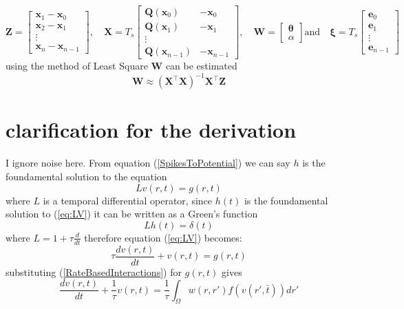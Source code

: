 \documentclass[onecolumn,draftcls]{IEEEtran}
\begin{document}
\begin{equation}
 \mathbf Z=\begin{bmatrix} \mathbf x_{1}-\mathbf x_{0}\\\mathbf x_{2}-\mathbf x_{1}\\\vdots\\\mathbf x_{n}-\mathbf x_{n-1}\end{bmatrix},\quad \mathbf X=T_s\begin{bmatrix}\mathbf Q(\mathbf x_0)&-\mathbf x_{0}\\\mathbf Q(\mathbf x_1)&-\mathbf x_{1}\\\vdots\\ \mathbf Q(\mathbf x_{n-1})&-\mathbf x_{n-1}\end{bmatrix},\quad \mathbf W=\begin{bmatrix} \boldsymbol{\theta} \\ \alpha\end{bmatrix} \text{and}\quad \boldsymbol \xi=T_s\begin{bmatrix}\mathbf e_0\\\mathbf e_1\\\vdots\\\mathbf e_{n-1}\end{bmatrix}
\end{equation}
using the method of Least Square $ \mathbf W$ can be estimated
\begin{equation}
 \mathbf W\approx(\mathbf X^\top\mathbf X)^{-1}\mathbf X^\top\mathbf Z
\end{equation}

\section{clarification for the derivation} 
I ignore noise here. From equation (\ref{SpikesToPotential}) we can say $h$ is the foundamental solution to the equation
\begin{equation}
 Lv(r,t)=g(r,t)
\label{eq:LV}
\end{equation}
where $L$ is a temporal differential operator, since $h(t)$ is the foundamental solution to (\ref{eq:LV}) it can be written as a Green's function
\begin{equation}
 Lh(t)=\delta(t)
\end{equation}
where $L=1+\tau\frac{d}{dt}$ therefore equation (\ref{eq:LV}) becomes:
\begin{equation}
\tau\frac{dv(r,t)}{dt}+ v(r,t)=g(r,t)
\end{equation}
substituting (\ref{RateBasedInteractions}) for $g(r,t)$ gives
\begin{equation}
\frac{dv\left( {r,t} \right)}{dt} + \frac{1}{\tau} v\left( r,t \right) = \frac{1}{\tau}\int_\Omega  {w\left( r,r' \right)f\left( {v\left( r',\bar t \right)} \right)dr'} 
\end{equation}
\end{document}
